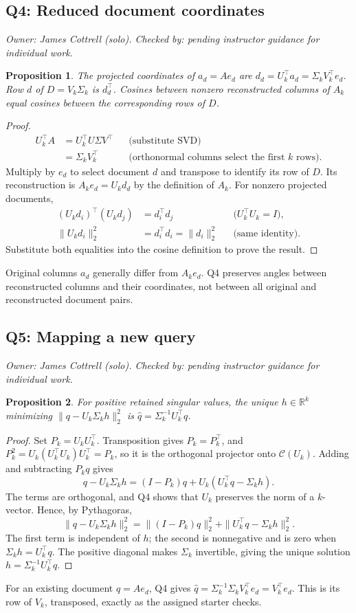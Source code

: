 \documentclass[11pt]{article}
\newtheorem{proposition}{Proposition}
\newcommand{\R}{\mathbb{R}}
\newcommand{\ownership}{\smallskip\textit{Owner: James Cottrell (solo).
Checked by: pending instructor guidance for individual work.}\par\smallskip}
\begin{document}
\subsection{Q4: Reduced document coordinates}
\ownership
\begin{proposition}
The projected coordinates of $a_d=Ae_d$ are
$d_d=U_k^\top a_d=\Sigma_kV_k^\top e_d$. Row $d$ of $D=V_k\Sigma_k$ is
$d_d^\top$. Cosines between nonzero reconstructed columns of $A_k$ equal cosines
between the corresponding rows of $D$.
\end{proposition}
\begin{proof}
\begin{align*}
U_k^\top A&=U_k^\top U\Sigma V^\top &&\text{(substitute SVD)}\\
&=\Sigma_kV_k^\top &&\text{(orthonormal columns select the first $k$ rows)}.
\end{align*}
Multiply by $e_d$ to select document $d$ and transpose to identify its row of $D$.
Its reconstruction is $A_ke_d=U_kd_d$ by the definition of $A_k$. For nonzero
projected documents,
\begin{align*}
(U_kd_i)^\top(U_kd_j)&=d_i^\top d_j &&\text{($U_k^\top U_k=I$)},\\
\|U_kd_i\|_2^2&=d_i^\top d_i=\|d_i\|_2^2 &&\text{(same identity)}.
\end{align*}
Substitute both equalities into the cosine definition to prove the result.
\end{proof}
Original columns $a_d$ generally differ from $A_ke_d$. Q4 preserves angles
between reconstructed columns and their coordinates, not between all original
and reconstructed document pairs.

\subsection{Q5: Mapping a new query}
\ownership
\begin{proposition}
For positive retained singular values, the unique $h\in\R^k$ minimizing
$\|q-U_k\Sigma_kh\|_2^2$ is $\widehat q=\Sigma_k^{-1}U_k^\top q$.
\end{proposition}
\begin{proof}
Set $P_k=U_kU_k^\top$. Transposition gives $P_k=P_k^\top$, and
$P_k^2=U_k(U_k^\top U_k)U_k^\top=P_k$, so it is the orthogonal projector onto
$\mathcal C(U_k)$. Adding and subtracting $P_kq$ gives
\[
q-U_k\Sigma_kh=(I-P_k)q+U_k(U_k^\top q-\Sigma_kh).
\]
The terms are orthogonal, and Q4 shows that $U_k$ preserves the norm of a
$k$-vector. Hence, by Pythagoras,
\[
\|q-U_k\Sigma_kh\|_2^2
=\|(I-P_k)q\|_2^2+\|U_k^\top q-\Sigma_kh\|_2^2.
\]
The first term is independent of $h$; the second is nonnegative and is zero when
$\Sigma_kh=U_k^\top q$. The positive diagonal makes $\Sigma_k$ invertible,
giving the unique solution $h=\Sigma_k^{-1}U_k^\top q$.
\end{proof}
For an existing document $q=Ae_d$, Q4 gives
$\widehat q=\Sigma_k^{-1}\Sigma_kV_k^\top e_d=V_k^\top e_d$.
This is its row of $V_k$, transposed, exactly as the assigned starter checks.
\end{document}
